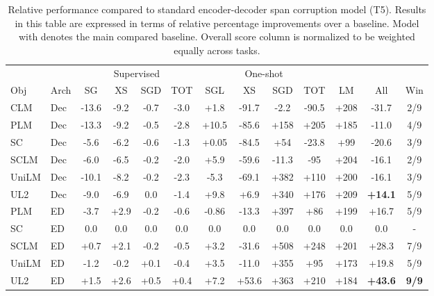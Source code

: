 \documentclass[10pt]{article}
\begin{document}
\begin{table*}[]
    \centering
\small
    \caption{Relative performance compared to standard encoder-decoder span corruption model (T5). Results in this table are expressed in terms of relative percentage improvements over a baseline. Model with  denotes the main compared baseline. Overall score column is normalized to be weighted equally across tasks.}
 \label{tab:relative_t5}
\begin{tabular}{llccccccccccc}
    \toprule
    & & \multicolumn{4}{c}{Supervised} & \multicolumn{4}{c}{One-shot}\\
        Obj &  Arch & SG & XS & SGD & TOT & SGL & XS & SGD & TOT   & LM & All & Win \\
        \midrule
  CLM       & Dec & -13.6 &	-9.2&	-0.7&	-3.0&	+1.8&	-91.7&	-2.2&	-90.5&	+208 & -31.7 & 2/9\\ 
PLM & Dec & -13.3	&  -9.2 & 	-0.5 & 	-2.8 & 	+10.5 & 	-85.6 & 	+158 & 	+205 & 	+185 &-11.0 & 4/9\\
SC & Dec & -5.6&	-6.2 &	-0.6&	-1.3&	+0.05&	-84.5&	+54&	-23.8&	+99 & -20.6 & 3/9\\
SCLM & Dec & -6.0	& -6.5 &	-0.2 &	-2.0  &	+5.9 &	-59.6	& -11.3 & 	-95 &	+204 & -16.1  & 2/9 \\
UniLM & Dec & -10.1 & 	-8.2 &	-0.2 &	-2.3 &	-5.3 &	-69.1 &	+382 &	+110 & 	+200 & -16.1 & 3/9\\
UL2 & Dec & -9.0 &	-6.9&	0.0&	-1.4&	+9.8&	+6.9&	+340&	+176	& +209 &  \textbf{+14.1} & 5/9 \\
  \midrule 
PLM & ED & -3.7& 	+2.9 &	-0.2&	-0.6	&-0.86&	-13.3&	+397	&+86&	+199 & +16.7 & 5/9 \\  
 SC & ED & 0.0	& 0.0	 & 0.0 &	0.0&	0.0 &	0.0 & 0.0 &	0.0 &	0.0 &	0.0 & - \\
 SCLM & ED & +0.7 &	+2.1	& -0.2 	& -0.5  &	+3.2 &	-31.6 &	+508 &	+248 &	+201 & +28.3 & 7/9 \\
 UniLM & ED &  -1.2 &	-0.2 &	+0.1 &	-0.4 &	+3.5 &	-11.0 &	+355 &	+95	 &+173 & +19.8 & 5/9\\
UL2 & ED & +1.5	& +2.6	&  +0.5 & 	+0.4 & 	+7.2& 	+53.6& 	+363& 	+210& 	+184 & \textbf{+43.6} & \textbf{9/9}\\
  \bottomrule 
    \end{tabular}
    
\end{table*}
\end{document}
